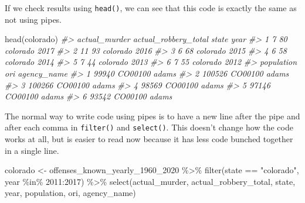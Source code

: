 \documentclass[
]{krantz}
\makeatletter
\newenvironment{Shaded}{\begin{snugshade}}{\end{snugshade}}
\newcommand{\CommentTok}[1]{\textcolor[rgb]{0.37,0.37,0.37}{\textit{#1}}}
\newcommand{\DecValTok}[1]{\textcolor[rgb]{0.06,0.06,0.06}{#1}}
\newcommand{\FunctionTok}[1]{\textcolor[rgb]{0,0,0}{#1}}
\newcommand{\NormalTok}[1]{#1}
\newcommand{\OtherTok}[1]{\textcolor[rgb]{0.37,0.37,0.37}{#1}}
\newcommand{\SpecialCharTok}[1]{\textcolor[rgb]{0,0,0}{#1}}
\newcommand{\StringTok}[1]{\textcolor[rgb]{0.5,0.5,0.5}{#1}}
\newenvironment{kframe}{%
\medskip{}
\setlength{\fboxsep}{.8em}
 \def\at@end@of@kframe{}%
 \ifinner\ifhmode%
  \def\at@end@of@kframe{\end{minipage}}%
  \begin{minipage}{\columnwidth}%
 \fi\fi%
 \def\FrameCommand##1{\hskip\@totalleftmargin \hskip-\fboxsep
 \colorbox{shadecolor}{##1}\hskip-\fboxsep
     \hskip-\linewidth \hskip-\@totalleftmargin \hskip\columnwidth}%
 \MakeFramed {\advance\hsize-\width
   \@totalleftmargin\z@ \linewidth\hsize
   \@setminipage}}%
 {\par\unskip\endMakeFramed%
 \at@end@of@kframe}
\renewenvironment{Shaded}{\begin{kframe}}{\end{kframe}}
\makeatother
\begin{document}
If we check results using \texttt{head()}, we can see that this code is exactly the same as not using pipes.

\begin{Shaded}
\begin{Highlighting}[]
\FunctionTok{head}\NormalTok{(colorado)}
\CommentTok{\#\textgreater{}   actual\_murder actual\_robbery\_total    state year}
\CommentTok{\#\textgreater{} 1             7                   80 colorado 2017}
\CommentTok{\#\textgreater{} 2            11                   93 colorado 2016}
\CommentTok{\#\textgreater{} 3             6                   68 colorado 2015}
\CommentTok{\#\textgreater{} 4             6                   58 colorado 2014}
\CommentTok{\#\textgreater{} 5             7                   44 colorado 2013}
\CommentTok{\#\textgreater{} 6             7                   55 colorado 2012}
\CommentTok{\#\textgreater{}   population     ori agency\_name}
\CommentTok{\#\textgreater{} 1      99940 CO00100       adams}
\CommentTok{\#\textgreater{} 2     100526 CO00100       adams}
\CommentTok{\#\textgreater{} 3     100266 CO00100       adams}
\CommentTok{\#\textgreater{} 4      98569 CO00100       adams}
\CommentTok{\#\textgreater{} 5      97146 CO00100       adams}
\CommentTok{\#\textgreater{} 6      93542 CO00100       adams}
\end{Highlighting}
\end{Shaded}

The normal way to write code using pipes is to have a new line after the pipe and after each comma in \texttt{filter()} and \texttt{select()}. This doesn't change how the code works at all, but is easier to read now because it has less code bunched together in a single line.

\begin{Shaded}
\begin{Highlighting}[]
\NormalTok{colorado }\OtherTok{\textless{}{-}}\NormalTok{ offenses\_known\_yearly\_1960\_2020 }\SpecialCharTok{\%\textgreater{}\%}
  \FunctionTok{filter}\NormalTok{(state }\SpecialCharTok{==} \StringTok{"colorado"}\NormalTok{,}
\NormalTok{         year }\SpecialCharTok{\%in\%} \DecValTok{2011}\SpecialCharTok{:}\DecValTok{2017}\NormalTok{) }\SpecialCharTok{\%\textgreater{}\%}
  \FunctionTok{select}\NormalTok{(actual\_murder, }
\NormalTok{         actual\_robbery\_total,}
\NormalTok{         state, }
\NormalTok{         year,}
\NormalTok{         population,}
\NormalTok{         ori, }
\NormalTok{         agency\_name)}
\end{Highlighting}
\end{Shaded}
\end{document}
